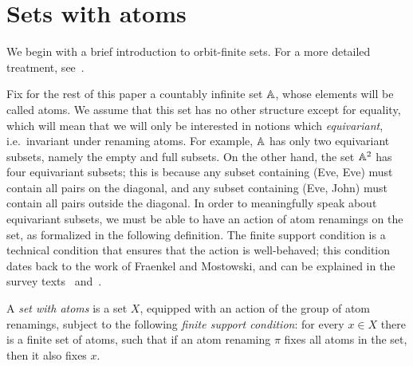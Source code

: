 \section{Sets with atoms}
We begin  with  a brief introduction to orbit-finite sets. For a more detailed treatment, see~\cite{bojanczyk_slightly2018}.

Fix for the rest of this paper a countably infinite set $\mathbb A$, whose elements will be called atoms.  We assume that this set has no other structure except for equality, which will mean that we will only be interested in notions which \emph{equivariant}, i.e.~invariant under renaming atoms. For example, $\mathbb A$ has only two equivariant subsets, namely the empty and full subsets. On the other hand, the set $\mathbb A^2$ has four equivariant subsets; this is because any subset containing (Eve, Eve) must contain all pairs on the diagonal, and any subset containing (Eve, John) must contain all pairs outside the diagonal.  In order to meaningfully speak about equivariant subsets, we must be able to have an action of atom renamings on the set, as formalized in the following definition. The finite support condition is a technical condition that ensures that the action is well-behaved; this condition dates back to the work of Fraenkel and Mostowski, and can be explained in the survey texts~\cite{PittsAM:nomsns} and~\cite{bojanczyk_slightly2018}.




\begin{definition}
    A \emph{set with atoms} is a set $X$, equipped with an action of the group of atom renamings, subject to the following \emph{finite support condition}: for every $x \in X$ there is a finite set of atoms, such that if an atom renaming $\pi$ fixes all atoms in the set, then it also fixes $x$.
\end{definition}

